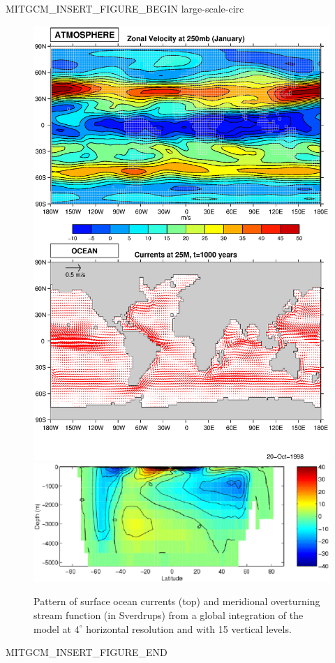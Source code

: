 \begin{rawhtml}MITGCM_INSERT_FIGURE_BEGIN large-scale-circ\end{rawhtml}
\begin{figure}
\begin{center}
 \includegraphics*[width=.8\textwidth,bb=65 70 510 390]{s_overview/figs/isovec_atmoce_new.ps}
 \includegraphics*[width=.8\textwidth]{s_overview/figs/moc.eps}
\end{center}
\caption{Pattern of surface ocean currents (top) and meridional
overturning stream function (in Sverdrups) from a global
integration of the model at $4^{\circ}$ horizontal resolution and with
15 vertical levels.}
\label{fig:large-scale-circ}
\end{figure}
\begin{rawhtml}MITGCM_INSERT_FIGURE_END\end{rawhtml}
